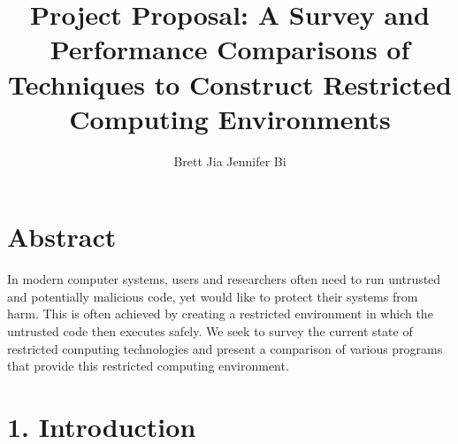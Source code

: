 \documentclass{proc}
\begin{document}
\title{Project Proposal: A Survey and Performance Comparisons of Techniques to Construct Restricted Computing Environments}

\author{Brett Jia \hspace{1em} Jennifer Bi}

\maketitle

\section*{Abstract}

In modern computer systems, users and researchers often need to run untrusted and potentially malicious code, yet would like to protect their systems from harm. This is often achieved by creating a restricted environment in which the untrusted code then executes safely. We seek to survey the current state of restricted computing technologies and present a comparison of various programs that provide this restricted computing environment.

\section*{1. Introduction}
\end{document}
